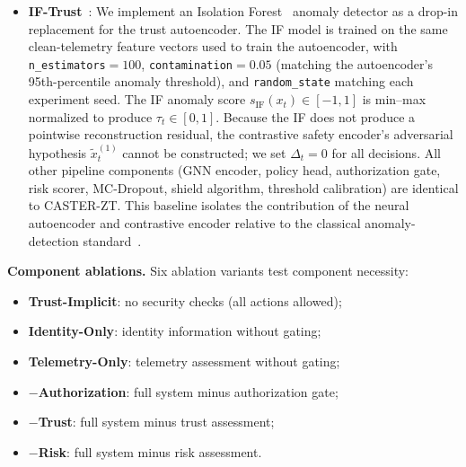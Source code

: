 \documentclass[10pt,journal,compsoc]{IEEEtran}
\begin{document}
\begin{itemize}
    The confidence score is computed as $\mathrm{conf}(\hat{a}_t) = \pi_\theta(\hat{a}_t \mid s_t) / \max_{a'} \pi_\theta(a' \mid s_t)$, the ratio of the selected action's policy score to the maximum score (normalized confidence).
    The deferral threshold $\beta$ is calibrated on a held-out validation set of 200 clean-condition episodes via Receiver Operating Characteristic (ROC) analysis: $\beta$ is set to the operating point that achieves $\le 2\%$ false-deferral rate under clean conditions, yielding $\beta = 0.72$.
    When $\mathrm{conf}(\hat{a}_t) \ge \beta$, the action is executed autonomously; when $\mathrm{conf}(\hat{a}_t) < \beta$, the action is deferred (not executed).
    No formal admissibility boundary, no identity verification, and no graduated scope reduction are included.
    \item \textbf{IF-Trust}~\cite{zahoor2025ifocsvm}: We implement an Isolation Forest~\cite{zahoor2025ifocsvm} anomaly detector as a drop-in replacement for the trust autoencoder.
    The IF model is trained on the same clean-telemetry feature vectors used to train the autoencoder, with \texttt{n\_estimators}$=100$, \texttt{contamination}$=0.05$ (matching the autoencoder's 95th-percentile anomaly threshold), and \texttt{random\_state} matching each experiment seed.
    The IF anomaly score $s_{\mathrm{IF}}(x_t) \in [-1,1]$ is min--max normalized to produce $\tau_t \in [0,1]$.
    Because the IF does not produce a pointwise reconstruction residual, the contrastive safety encoder's adversarial hypothesis $\tilde{x}_t^{(1)}$ cannot be constructed; we set $\Delta_t = 0$ for all decisions.
    All other pipeline components (GNN encoder, policy head, authorization gate, risk scorer, MC-Dropout, shield algorithm, threshold calibration) are identical to CASTER-ZT.
    This baseline isolates the contribution of the neural autoencoder and contrastive encoder relative to the classical anomaly-detection standard~\cite{zahoor2025ifocsvm,haque2023dbscanwsn}.
\end{itemize}

\noindent\textbf{Component ablations.}
Six ablation variants test component necessity:
\begin{itemize}
    \item \textbf{Trust-Implicit}: no security checks (all actions allowed);
    \item \textbf{Identity-Only}: identity information without gating;
    \item \textbf{Telemetry-Only}: telemetry assessment without gating;
    \item \textbf{$-$Authorization}: full system minus authorization gate;
    \item \textbf{$-$Trust}: full system minus trust assessment;
    \item \textbf{$-$Risk}: full system minus risk assessment.
\end{itemize}
\end{document}

